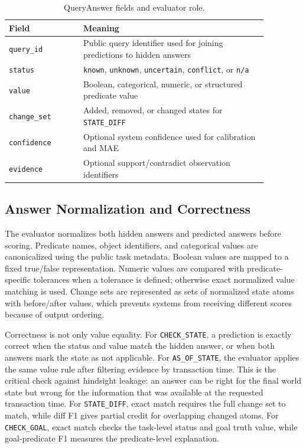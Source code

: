 \documentclass[conference]{IEEEtran}
\begin{document}
\begin{table}[!t]
\caption{QueryAnswer fields and evaluator role.}
\label{tab:answer-schema}
\centering
\footnotesize
\begin{tabular}{@{}p{0.25\linewidth}p{0.62\linewidth}@{}}
\toprule
Field & Meaning \\
\midrule
\texttt{query\_id} & Public query identifier used for joining predictions to hidden answers \\
\texttt{status} & \texttt{known}, \texttt{unknown}, \texttt{uncertain}, \texttt{conflict}, or \texttt{n/a} \\
\texttt{value} & Boolean, categorical, numeric, or structured predicate value \\
\texttt{change\_set} & Added, removed, or changed states for \texttt{STATE\_DIFF} \\
\texttt{confidence} & Optional system confidence used for calibration and MAE \\
\texttt{evidence} & Optional support/contradict observation identifiers \\
\bottomrule
\end{tabular}
\end{table}

\subsection{Answer Normalization and Correctness}

The evaluator normalizes both hidden answers and predicted answers before scoring. Predicate names, object identifiers, and categorical values are canonicalized using the public task metadata. Boolean values are mapped to a fixed true/false representation. Numeric values are compared with predicate-specific tolerances when a tolerance is defined; otherwise exact normalized value matching is used. Change sets are represented as sets of normalized state atoms with before/after values, which prevents systems from receiving different scores because of output ordering.

Correctness is not only value equality. For \texttt{CHECK\_STATE}, a prediction is exactly correct when the status and value match the hidden answer, or when both answers mark the state as not applicable. For \texttt{AS\_OF\_STATE}, the evaluator applies the same value rule after filtering evidence by transaction time. This is the critical check against hindsight leakage: an answer can be right for the final world state but wrong for the information that was available at the requested transaction time. For \texttt{STATE\_DIFF}, exact match requires the full change set to match, while diff F1 gives partial credit for overlapping changed atoms. For \texttt{CHECK\_GOAL}, exact match checks the task-level status and goal truth value, while goal-predicate F1 measures the predicate-level explanation.
\end{document}
